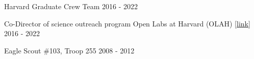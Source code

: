 
\begin{cvhonors}
  \cvlist
    {Harvard Graduate Crew Team} %
    {2016 - 2022} %
    
  \cvlist
    {Co-Director of science outreach program Open Labs at Harvard (OLAH) \href{https://www.theopenlabs.org/harvard}{[link]}} %
    {2016 - 2022} %
    
  \cvlist
    {Eagle Scout \#103, Troop 255} %
    {2008 - 2012} %
    
\end{cvhonors}